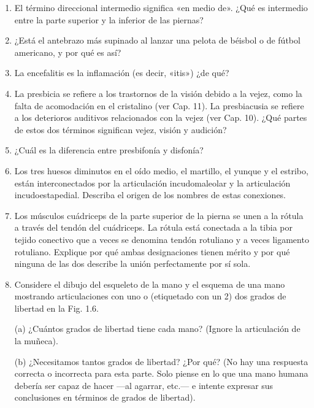 \documentclass[12pt]{book}
\begin{document}
\begin{enumerate}
\item[1.12] El término direccional intermedio significa «en medio de». ¿Qué es intermedio entre la parte superior y la inferior de las piernas?

\item[1.13] ¿Está el antebrazo más supinado al lanzar una pelota de béisbol o de fútbol americano, y por qué es así?

\item[1.14] La encefalitis es la inflamación (es decir, «itis») ¿de qué?

\item[1.15] La presbicia se refiere a los trastornos de la visión debido a la vejez, como la falta de acomodación en el cristalino (ver Cap. 11). La presbiacusia se refiere a los deterioros auditivos relacionados con la vejez (ver Cap. 10). ¿Qué partes de estos dos términos significan vejez, visión y audición?

\item[1.16] ¿Cuál es la diferencia entre presbifonía y disfonía?

\item[1.17] Los tres huesos diminutos en el oído medio, el martillo, el yunque y el estribo, están interconectados por la articulación incudomaleolar y la articulación incudoestapedial. Describa el origen de los nombres de estas conexiones.

\item[1.18] Los músculos cuádriceps de la parte superior de la pierna se unen a la rótula a través del tendón del cuádriceps. La rótula está conectada a la tibia por tejido conectivo que a veces se denomina tendón rotuliano y a veces ligamento rotuliano. Explique por qué ambas designaciones tienen mérito y por qué ninguna de las dos describe la unión perfectamente por sí sola.

\item[1.19] Considere el dibujo del esqueleto de la mano y el esquema de una mano mostrando articulaciones con uno o (etiquetado con un 2) dos grados de libertad en la Fig. 1.6.
  
  (a) ¿Cuántos grados de libertad tiene cada mano? (Ignore la articulación de la muñeca).
  
  (b) ¿Necesitamos tantos grados de libertad? ¿Por qué? (No hay una respuesta correcta o incorrecta para esta parte. Solo piense en lo que una mano humana debería ser capaz de hacer ---al agarrar, etc.--- e intente expresar sus conclusiones en términos de grados de libertad).


\end{enumerate}
\end{document}
